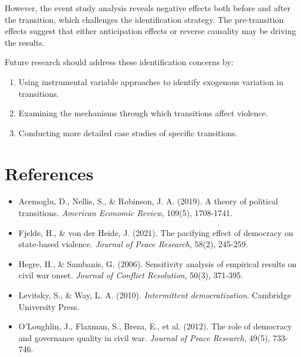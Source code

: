 \documentclass[12pt]{article}
\begin{document}
However, the event study analysis reveals negative effects both before and after the transition, which challenges the identification strategy. The pre-transition effects suggest that either anticipation effects or reverse causality may be driving the results.

Future research should address these identification concerns by:

\begin{enumerate}
    \item Using instrumental variable approaches to identify exogenous variation in transitions.

    \item Examining the mechanisms through which transitions affect violence.

    \item Conducting more detailed case studies of specific transitions.
\end{enumerate}

\section*{References}

\begin{itemize}
    \item Acemoglu, D., Nellis, S., \& Robinson, J. A. (2019). A theory of political transitions. \textit{American Economic Review}, 109(5), 1708-1741.

    \item Fjelde, H., \& von der Heide, J. (2021). The pacifying effect of democracy on state-based violence. \textit{Journal of Peace Research}, 58(2), 245-259.

    \item Hegre, H., \& Sambanis, G. (2006). Sensitivity analysis of empirical results on civil war onset. \textit{Journal of Conflict Resolution}, 50(3), 371-395.

    \item Levitsky, S., \& Way, L. A. (2010). \textit{Intermittent democratization}. Cambridge University Press.

    \item O'Loughlin, J., Flaxman, S., Breza, E., et al. (2012). The role of democracy and governance quality in civil war. \textit{Journal of Peace Research}, 49(5), 733-746.
\end{itemize}
\end{document}
